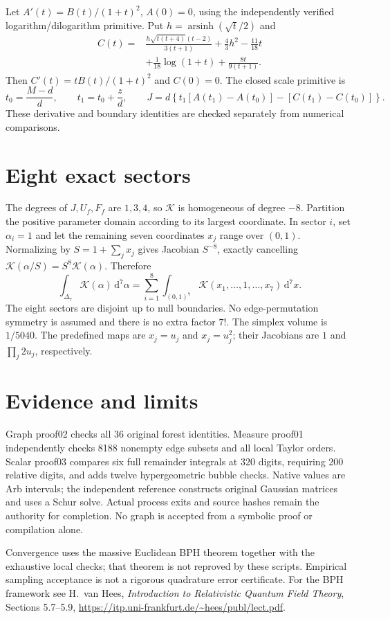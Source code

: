 \documentclass[11pt]{article}
\newcommand{\dd}{\mathrm{d}}
\begin{document}
Let $A'(t)=B(t)/(1+t)^2$, $A(0)=0$, using the independently verified
logarithm/dilogarithm primitive. Put $h=\operatorname{arsinh}(\sqrt t/2)$ and
\[
 \begin{split}
 C(t)={}&\frac{h\sqrt{t(t+4)}(t-2)}{3(t+1)}
       +\frac43h^2-\frac{11}{18}t\\
       &+\frac1{18}\log(1+t)+\frac{8t}{9(t+1)} .
 \end{split}
\]
Then $C'(t)=tB(t)/(1+t)^2$ and $C(0)=0$. The closed scale primitive is
\[
 t_0=\frac{M-d}{d},\qquad t_1=t_0+\frac zd,\qquad
 J=d\left\{t_1[A(t_1)-A(t_0)]-[C(t_1)-C(t_0)]\right\}.
\]
These derivative and boundary identities are checked separately from
numerical comparisons.

\section*{Eight exact sectors}
The degrees of $J,U_f,F_f$ are $1,3,4$, so $\mathcal K$ is homogeneous
of degree $-8$. Partition the positive parameter domain according to its
largest coordinate. In sector $i$, set $\alpha_i=1$ and let the remaining
seven coordinates $x_j$ range over $(0,1)$. Normalizing by
$S=1+\sum_j x_j$ gives Jacobian $S^{-8}$, exactly cancelling
$\mathcal K(\alpha/S)=S^8\mathcal K(\alpha)$. Therefore
\[
 \int_{\Delta_7}\mathcal K(\alpha)\,\dd^7\alpha
 =\sum_{i=1}^8\int_{(0,1)^7}
   \mathcal K(x_1,\ldots,1,\ldots,x_7)\,\dd^7x .
\]
The eight sectors are disjoint up to null boundaries. No edge-permutation
symmetry is assumed and there is no extra factor $7!$.
The simplex volume is $1/5040$.
The predefined maps are $x_j=u_j$ and $x_j=u_j^2$; their Jacobians are
$1$ and $\prod_j2u_j$, respectively.

\section*{Evidence and limits}
Graph proof02 checks all 36 original forest identities. Measure proof01
independently checks 8188 nonempty edge subsets and all local Taylor orders.
Scalar proof03 compares six full remainder integrals at 320 digits,
requiring 200 relative digits, and adds twelve hypergeometric bubble checks.
Native values are Arb intervals; the independent reference constructs
original Gaussian matrices and uses a Schur solve.
Actual process exits and source hashes remain the authority for completion.
No graph is accepted from a symbolic proof or compilation alone.

Convergence uses the massive Euclidean BPH theorem together with the
exhaustive local checks; that theorem is not reproved by these scripts.
Empirical sampling acceptance is not a rigorous quadrature error
certificate. For the BPH framework see H.~van Hees,
\emph{Introduction to Relativistic Quantum Field Theory},
Sections 5.7--5.9,
\url{https://itp.uni-frankfurt.de/~hees/publ/lect.pdf}.
\end{document}
